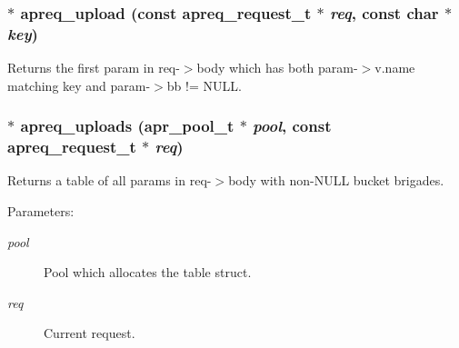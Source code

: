 \subsubsection{$\ast$ apreq\_\-upload (const {\bf apreq\_\-request\_\-t} $\ast$ {\em req}, const char $\ast$ {\em key})}\label{group__params_a11}


Returns the first param in req-$>$body which has both param-$>$v.name matching key and param-$>$bb != NULL. 
\subsubsection{$\ast$ apreq\_\-uploads ({\bf apr\_\-pool\_\-t} $\ast$ {\em pool}, const {\bf apreq\_\-request\_\-t} $\ast$ {\em req})}\label{group__params_a10}


Returns a table of all params in req-$>$body with non-NULL bucket brigades. \begin{Desc}
\item[Parameters:]
\begin{description}
\item[{\em pool}]Pool which allocates the table struct. \item[{\em req}]Current request. \end{description}
\end{Desc}
